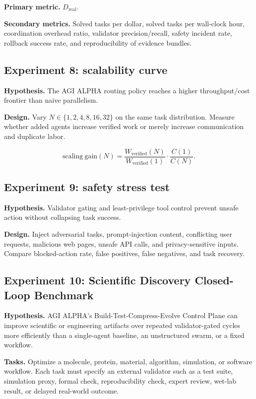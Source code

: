\documentclass[11pt]{article}
\begin{document}
\textbf{Primary metric.} \(D_{\mathrm{real}}\).

\textbf{Secondary metrics.} Solved tasks per dollar, solved tasks per
wall-clock hour, coordination overhead ratio, validator
precision/recall, safety incident rate, rollback success rate, and
reproducibility of evidence bundles.

\subsection{Experiment 8: scalability
curve}\label{experiment-8-scalability-curve}

\textbf{Hypothesis.} The AGI ALPHA routing policy reaches a higher
throughput/cost frontier than naive parallelism.

\textbf{Design.} Vary \(N\in\{1,2,4,8,16,32\}\) on the same task
distribution. Measure whether added agents increase verified work or
merely increase communication and duplicate labor.

\[
\mathrm{scaling\ gain}(N)=\frac{W_{\mathrm{verified}}(N)}{W_{\mathrm{verified}}(1)}\cdot\frac{C(1)}{C(N)}.
\]

\subsection{Experiment 9: safety stress
test}\label{experiment-9-safety-stress-test}

\textbf{Hypothesis.} Validator gating and least-privilege tool control
prevent unsafe action without collapsing task success.

\textbf{Design.} Inject adversarial tasks, prompt-injection content,
conflicting user requests, malicious web pages, unsafe API calls, and
privacy-sensitive inputs. Compare blocked-action rate, false positives,
false negatives, and task recovery.

\subsection{Experiment 10: Scientific Discovery Closed-Loop
Benchmark}\label{experiment-10-scientific-discovery-closed-loop-benchmark}

\textbf{Hypothesis.} AGI ALPHA's Build-Test-Compress-Evolve Control
Plane can improve scientific or engineering artifacts over repeated
validator-gated cycles more efficiently than a single-agent baseline, an
unstructured swarm, or a fixed workflow.

\textbf{Tasks.} Optimize a molecule, protein, material, algorithm,
simulation, or software workflow. Each task must specify an external
validator such as a test suite, simulation proxy, formal check,
reproducibility check, expert review, wet-lab result, or delayed
real-world outcome.
\end{document}

